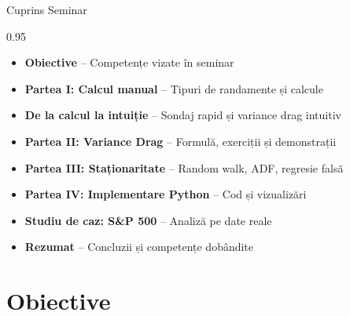 \documentclass[9pt, aspectratio=169, t]{beamer}
\subtitle{Seminar 1: Randamente și Staționaritate}
\begin{document}
{
\begin{frame}
    \titlepage
\end{frame}
}

\begin{frame}{Cuprins Seminar}
    \begin{cminipage}{0.95\textwidth}
    \begin{itemize}\setlength{\itemsep}{0pt}
        \item \textbf{Obiective} -- Competențe vizate în seminar
        \vspace{0.15cm}
        \item \textbf{Partea I: Calcul manual} -- Tipuri de randamente și calcule
        \vspace{0.15cm}
        \item \textbf{De la calcul la intuiție} -- Sondaj rapid și variance drag intuitiv
        \vspace{0.15cm}
        \item \textbf{Partea II: Variance Drag} -- Formulă, exerciții și demonstrații
        \vspace{0.15cm}
        \item \textbf{Partea III: Staționaritate} -- Random walk, ADF, regresie falsă
        \vspace{0.15cm}
        \item \textbf{Partea IV: Implementare Python} -- Cod și vizualizări
        \vspace{0.15cm}
        \item \textbf{Studiu de caz: S\&P 500} -- Analiză pe date reale
        \vspace{0.15cm}
        \item \textbf{Rezumat} -- Concluzii și competențe dobândite
    \end{itemize}
    \end{cminipage}
\end{frame}

\section{Obiective}
\end{document}
